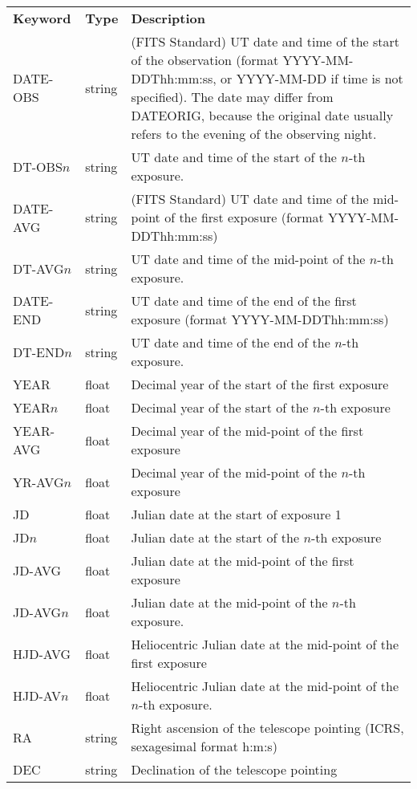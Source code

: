 \documentclass[11pt]{ivoa}
\begin{document}
\begingroup
\footnotesize
\begin{longtable}{llp{}}
\sptablerule
\textbf{Keyword}&\textbf{Type}&\textbf{Description}\\
\sptablerule
DATE-OBS  & string     &(FITS Standard) UT date and time of the
          start of the observation (format YYYY-MM-DDThh:mm:ss, or
          YYYY-MM-DD if time is not specified). The date may differ
          from DATEORIG, because the original date usually refers to the
          evening of the observing night.\\
DT-OBS$n$ &string     &UT date and time of the start of the
$n$-th exposure.\\
DATE-AVG  &string     &(FITS Standard) UT date and time of the
mid-point of the first exposure (format YYYY-MM-DDThh:mm:ss)\\
DT-AVG$n$ &string     &UT date and time of the mid-point of
the $n$-th exposure.\\
DATE-END  &string     &UT date and time of the end of the
          first exposure (format YYYY-MM-DDThh:mm:ss)\\
DT-END$n$ &string     &UT date and time of the end of the $n$-th
exposure.\\
YEAR      &float     &Decimal year of the start of the first
exposure\\
YEAR$n$   &float     &Decimal year of the start of the $n$-th
exposure\\
YEAR-AVG  &float     &Decimal year of the mid-point of the
first exposure\\
YR-AVG$n$ &float     &Decimal year of the mid-point of the
$n$-th exposure\\
JD        &float     &Julian date at the start of exposure 1\\
JD$n$     &float     &Julian date at the start of the $n$-th exposure\\
JD-AVG    &float     &Julian date at the mid-point of the
first exposure\\
JD-AVG$n$ &float     &Julian date at the mid-point of the $n$-th
exposure.\\
HJD-AVG   &float     &Heliocentric Julian date at the
mid-point of the first exposure\\
HJD-AV$n$ &float     &Heliocentric Julian date at the
mid-point of the $n$-th exposure.\\
RA        &string    & Right ascension of the telescope
pointing (ICRS, sexagesimal format h:m:s)\\
DEC       &string    & Declination of the telescope pointing

\end{longtable}
\end{document}
